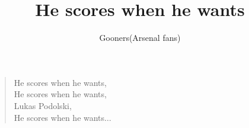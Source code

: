 \documentclass[a4paper,12pt]{article}
\title{He scores when he wants}
\author{Gooners(Arsenal fans)}
\date{}
\begin{document}
	
	\maketitle
	
	\begin{verse}
		
		He scores when he wants, \\
		He scores when he wants, \\
		Lukas Podolski, \\
		He scores when he wants$\ldots$
		
	\end{verse}
	
\end{document}
